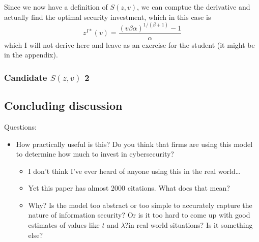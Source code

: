 \documentclass[11pt]{article}
\begin{document}
Since we now have a definition of $S(z,v)$, we can comptue the derivative and actually find the optimal security investment, which in this case is 
$$z^{I*}(v) = \frac{(v \beta \alpha )^{1/(\beta + 1)} - 1}{\alpha}$$ 
which I will not derive here and leave as an exercise for the student (it might be in the appendix).

\subsubsection{Candidate $S(z,v)$ 2}


\subsection{Concluding discussion}

Questions:
\begin{itemize}
    \item How practically useful is this? Do you think that firms are using this model to determine how much to invest in cybersecurity?
    \begin{itemize}
        \item I don't think I've ever heard of anyone using this in the real world\dots
        \item Yet this paper has almost 2000 citations. What does that mean?
        \item Why? Is the model too abstract or too simple to accurately capture the nature of information security? Or is it too hard to come up with good estimates of values like $t$ and $\lambda$?in real world situations? Is it something else?
    \end{itemize}
\end{itemize}
\end{document}
